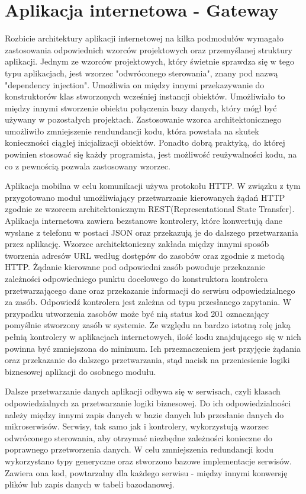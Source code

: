 	
\section{Aplikacja internetowa - Gateway}	
{	Rozbicie architektury aplikacji internetowej na kilka podmodułów wymagało zastosowania odpowiednich wzorców projektowych oraz przemyślanej struktury aplikacji. Jednym ze wzorców projektowych, który świetnie sprawdza się w tego typu aplikacjach, jest wzorzec "odwróconego sterowania", znany pod nazwą "dependency injection". Umożliwia on między innymi przekazywanie do konstruktorów klas stworzonych wcześniej instancji obiektów. Umożliwiało to między innymi stworzenie obiektu połączenia bazy danych, który mógł być używany w pozostałych projektach. Zastosowanie wzorca architektonicznego umożliwiło zmniejszenie rendundancji kodu, która powstała na skutek konieczności ciągłej inicjalizacji obiektów. Ponadto dobrą praktyką, do której powinien stosować się każdy programista, jest możliwość reużywalności kodu, na co z pewnością pozwala zastosowany wzorzec. 

Aplikacja mobilna w celu komunikacji używa protokołu HTTP. W związku z tym 	 przygotowano moduł umożliwiający przetwarzanie kierowanych żądań HTTP zgodnie ze wzorcem architektonicznym REST(Representational State Transfer). Aplikacja internetowa zawiera bezstanowe kontrolery, które konwertują dane wysłane z telefonu w postaci JSON oraz przekazują je do dalszego przetwarzania przez aplikację. Wzorzec architektoniczny zakłada między innymi sposób tworzenia adresów URL według dostępów do zasobów oraz zgodnie z metodą HTTP. Żądanie kierowane pod odpowiedni zasób powoduje przekazanie zależności odpowiedniego punktu docelowego do konstruktora kontrolera przetwarzającego dane oraz przekazanie informacji do serwisu odpowiedzialnego za zasób. Odpowiedź kontrolera jest zależna od typu przesłanego zapytania. W przypadku utworzenia zasobów może być nią status kod 201 oznaczający pomyślnie stworzony zasób w systemie. Ze względu na bardzo istotną rolę jaką pełnią kontrolery w aplikacjach internetowych, ilość kodu znajdującego się w nich powinna być zmniejszona do minimum. Ich przeznaczeniem jest przyjęcie żądania oraz przekazanie do dalszego przetwarzania, stąd nacisk na przeniesienie logiki biznesowej aplikacji do osobnego modułu.

Dalsze przetwarzanie danych aplikacji odbywa się w serwisach, czyli klasach odpowiedzialnych za przetwarzanie logiki biznesowej. Do ich odpowiedzialności należy między innymi zapis danych w bazie danych lub przesłanie danych do mikroserwisów. Serwisy, tak samo jak i kontrolery, wykorzystują wzorzec odwróconego sterowania, aby otrzymać niezbędne zależności konieczne do poprawnego przetworzenia danych. W celu zmniejszenia redundancji kodu wykorzystano typy generyczne oraz stworzono bazowe implementacje serwisów. Zawiera ona kod, powtarzalny dla każdego serwisu - między innymi konwersję plików lub zapis danych w tabeli bazodanowej. 

}
